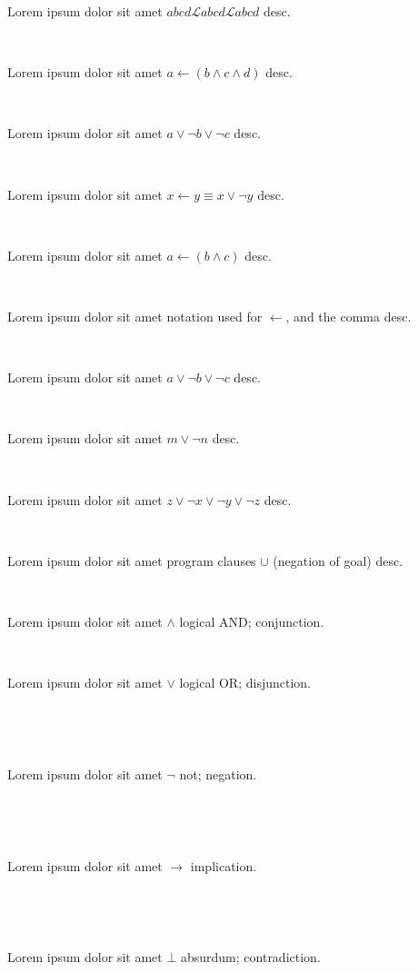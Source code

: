 \documentclass[12pt]{article}
\begin{document}
Lorem ipsum dolor sit amet $ abcd \mathscr{L} abcd \mathcal{L}  abcd $ desc.

\centerline{~}

Lorem ipsum dolor sit amet $ a \leftarrow ( b \wedge c \wedge d )  $ desc.

\centerline{~}

Lorem ipsum dolor sit amet $ a \vee \neg b \vee \neg c $ desc.

\centerline{~}

Lorem ipsum dolor sit amet $ x \leftarrow y \equiv x \vee \neg y $ desc.

\centerline{~}

Lorem ipsum dolor sit amet $ a \leftarrow ( b \wedge c ) $ desc.

\centerline{~}

Lorem ipsum dolor sit amet notation used for $ \leftarrow $, and the comma  desc.

\centerline{~}

Lorem ipsum dolor sit amet $ a \vee \neg b \vee \neg c $ desc.

\centerline{~}

Lorem ipsum dolor sit amet $ m \vee \neg n $ desc.

\centerline{~}

Lorem ipsum dolor sit amet $ z \vee \neg x \vee \neg y \vee \neg z $ desc.

\centerline{~}

Lorem ipsum dolor sit amet program clauses $ \cup $ (negation of goal) desc.


\centerline{~}

Lorem ipsum dolor sit amet $ \wedge $ logical AND; conjunction.

\centerline{~}

Lorem ipsum dolor sit amet $ \vee $ logical OR; disjunction.

\centerline{~}

\centerline{~}

Lorem ipsum dolor sit amet $ \neg $ not; negation.

\centerline{~}

\centerline{~}

Lorem ipsum dolor sit amet $ \rightarrow $ implication.

\centerline{~}

\centerline{~}

Lorem ipsum dolor sit amet $ \bot $ absurdum; contradiction.

\centerline{~}
\end{document}
